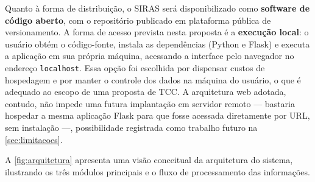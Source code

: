 Quanto à forma de distribuição, o SIRAS será disponibilizado como
\textbf{software de código aberto}, com o repositório publicado em
plataforma pública de versionamento. A forma de acesso prevista nesta
proposta é a \textbf{execução local}: o usuário obtém o código-fonte,
instala as dependências (Python e Flask) e executa a aplicação em sua
própria máquina, acessando a interface pelo navegador no endereço
\texttt{localhost}. Essa opção foi escolhida por dispensar custos de
hospedagem e por manter o controle dos dados na máquina do usuário, o
que é adequado ao escopo de uma proposta de TCC. A arquitetura web
adotada, contudo, não impede uma futura implantação em servidor remoto
--- bastaria hospedar a mesma aplicação Flask para que fosse acessada
diretamente por URL, sem instalação ---, possibilidade registrada como
trabalho futuro na \cref{sec:limitacoes}.

A \cref{fig:arquitetura} apresenta uma visão conceitual da arquitetura do sistema,
ilustrando os três módulos principais e o fluxo de processamento das informações.

